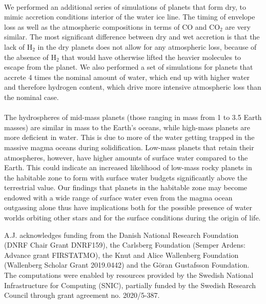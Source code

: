 \documentclass[bibyear,tradiabstract]{aa}
\begin{document}
\\
We performed an additional series of simulations of planets that form dry, to mimic accretion conditions interior of the water ice line. The timing of envelope loss as well as the atmospheric compositions in terms of CO and CO$_2$ are very similar. The most significant difference between dry and wet accretion is that the lack of H$_2$ in the dry planets does not allow for any atmospheric loss, because of the absence of H$_2$ that would have otherwise lifted the heavier molecules to escape from the planet. We also performed a set of simulations for planets that accrete 4 times the nominal amount of water, which end up with higher water and therefore hydrogen content, which drive more intensive atmospheric loss than the nominal case.\\
\\
The hydrospheres of mid-mass planets (those ranging in mass from 1 to 3.5 Earth masses) are similar in mass to the Earth's oceans, while high-mass planets are more deficient in water. This is due to more of the water getting trapped in the massive magma oceans during solidification. Low-mass planets that retain their atmospheres, however, have higher amounts of surface water compared to the Earth. This could indicate an increased likelihood of low-mass rocky planets in the habitable zone to form with surface water budgets significantly above the terrestrial value. Our findings that planets in the habitable zone may become endowed with a wide range of surface water even from the magma ocean outgassing alone thus have implications both for the possible presence of water worlds orbiting other stars and for the surface conditions during the origin of life.

\begin{acknowledgements}
    A.J. acknowledges funding from the Danish National Research Foundation (DNRF Chair Grant DNRF159), the Carlsberg Foundation (Semper Ardens: Advance grant FIRSTATMO), the Knut and Alice Wallenberg  Foundation (Wallenberg Scholar Grant 2019.0442) and the Göran Gustafsson Foundation. The computations were enabled by resources provided by the Swedish National Infrastructure for Computing (SNIC), partially funded by the Swedish Research Council through grant agreement no. 2020/5-387. 
\end{acknowledgements}
\end{document}
